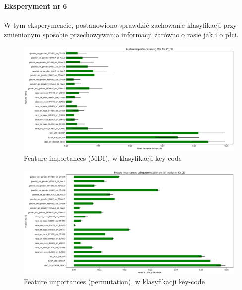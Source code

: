 \documentclass{classrep}
\begin{document}
{{{                \paragraph{Eksperyment nr 6}{
                        W tym eksperymencie, postanowiono sprawdzić zachowanie
                        klasyfikacji przy zmienionym sposobie przechowywania informacji
                        zarówno o rasie jak i o płci.
                    \begin{figure}[!htbp]
                        \centering
                        \includegraphics[width=\textwidth]{img/5.1.3/6/Feature importances using MDI for KY_CD.png}
                        \caption{Feature importances (MDI), w klasyfikacji key-code}
                        \label{goal_1_exp_6_imp_mdi_key}
                    \end{figure}
                    
                    \begin{figure}[!htbp]
                        \centering
                        \includegraphics[width=\textwidth]{img/5.1.3/6/Feature importances using permutation on full model for KY_CD.png}
                        \caption{Feature importances (permutation), w klasyfikacji key-code}
                        \label{goal_1_exp_6_imp_perm_key}
                    \end{figure}
                    
}}}}
\end{document}
